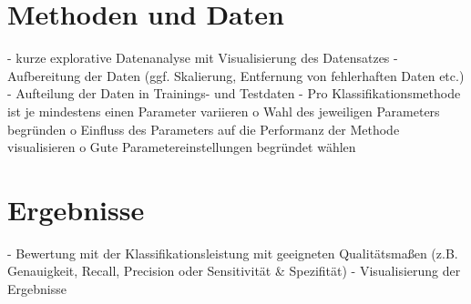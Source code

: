 \section{Methoden und Daten}

- kurze explorative Datenanalyse mit Visualisierung des Datensatzes
- Aufbereitung der Daten (ggf. Skalierung, Entfernung von fehlerhaften Daten etc.)
- Aufteilung der Daten in Trainings- und Testdaten
- Pro Klassifikationsmethode ist je mindestens einen Parameter variieren
	o Wahl des jeweiligen Parameters begründen
	o Einfluss des Parameters auf die Performanz der Methode visualisieren
	o Gute Parametereinstellungen begründet wählen

\section{Ergebnisse}

- Bewertung mit der Klassifikationsleistung mit geeigneten Qualitätsmaßen (z.B. Genauigkeit, Recall, Precision oder Sensitivität \& Spezifität)
- Visualisierung der Ergebnisse